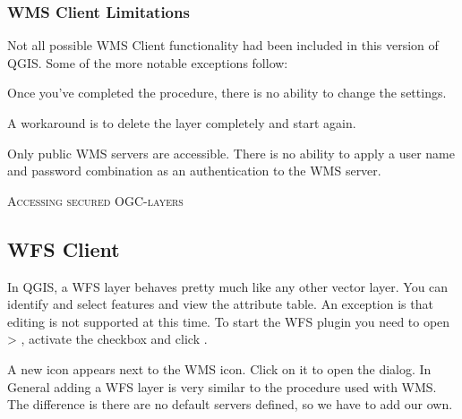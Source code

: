 \subsubsection{WMS Client Limitations}\label{sec:ogc-wms-limits}

Not all possible WMS Client functionality had been included in this version of QGIS.
Some of the more notable exceptions follow:


Once you've completed the 
procedure, there is no ability to change the settings.

A workaround is to delete the layer completely and start again.


Only public WMS servers are accessible.
There is no ability to apply a user name and password combination
as an authentication to the WMS server.

\begin{Tip}[ht]\caption{\textsc{Accessing secured OGC-layers}}
\end{Tip}


\subsection{WFS Client}

In QGIS, a WFS layer behaves pretty much like any other vector layer. You 
can identify and select features and view the attribute table. An exception 
is that editing is not supported at this time. To start the WFS plugin you 
need to open  > , 
activate the  checkbox and click . 

A new  icon appears next 
to the WMS icon. Click on it to open the dialog. In General adding a WFS 
layer is very similar to the procedure used with WMS. The difference is 
there are no default servers defined, so we have to add our own.

